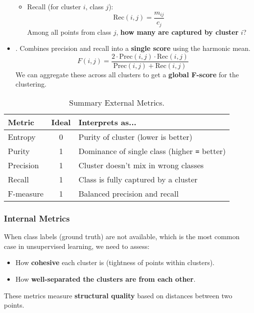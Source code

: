 \begin{itemize}
\begin{itemize}
        \item Recall (for cluster $i$, class $j$):
        \begin{equation}
            \text{Rec}\left(i,j\right) = \dfrac{m_{ij}}{c_{j}}
        \end{equation}
        Among all points from class $j$, \textbf{how many are captured by cluster} $i$?
    \end{itemize}


    \item {}. Combines precision and recall into a \textbf{single score} using the harmonic mean.
    \begin{equation}
        F\left(i,j\right) = \dfrac{2 \cdot \text{Prec}\left(i,j\right) \cdot \text{Rec}\left(i,j\right)}{\text{Prec}\left(i,j\right) + \text{Rec}\left(i,j\right)}
    \end{equation}
    We can aggregate these across all clusters to get a \textbf{global F-score} for the clustering.
\end{itemize}

\newpage

\begin{table}[!htp]
    \centering
    \begin{tabular}{@{} l | c | l @{}}
        \toprule
        Metric & Ideal & Interprets as... \\
        \midrule
        Entropy     & 0     & Purity of cluster (lower is better)       \\ [.3em]
        Purity      & 1     & Dominance of single class (higher \texttt{=} better) \\ [.3em]
        Precision   & 1     & Cluster doesn't mix in wrong classes      \\ [.3em]
        Recall      & 1     & Class is fully captured by a cluster      \\ [.3em]
        F-measure   & 1     & Balanced precision and recall             \\
        \bottomrule
    \end{tabular}
    \caption{Summary External Metrics.}
\end{table}

\longline

\subsubsection{Internal Metrics}

When class labels (ground truth) are not available, which is the most common case in unsupervised learning, we need  to assess:
\begin{itemize}
    \item How \textbf{cohesive} each cluster is (tightness of points within clusters).
    \item How \textbf{well-separated the clusters are from each other}.
\end{itemize}
These metrics measure \textbf{structural quality} based on distances between two points.

